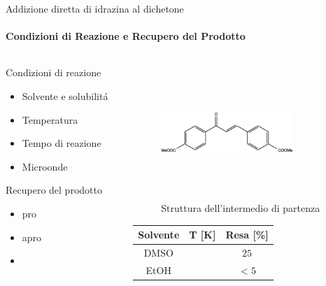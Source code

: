 \documentclass{beamer}
\begin{document}
\begin{frame}{Addizione diretta di idrazina al dichetone}
	\framesubtitle{Condizioni di Reazione e Recupero del Prodotto}
	\begin{columns}
		\hspace{1cm}
		\begin{column}{0.5\textwidth}
			Condizioni di reazione
			\begin{itemize}
				\item Solvente e solubilitá
				\item Temperatura
				\item Tempo di reazione
				\item Microonde
			\end{itemize}
			\vspace{0.2cm}
			Recupero del prodotto
			\begin{itemize}
				\item pro
				\item apro
				\item
			\end{itemize}
		\end{column}
		\hspace{-3cm}
		\begin{column}{0.5\textwidth}
			\vspace{-0.5cm}
			\begin{figure}[h!]
				\centering
				\includegraphics[width=5cm,height=5cm,keepaspectratio]{../Structures/unsaturated.eps}
				\caption{Struttura dell'intermedio di partenza}
			\end{figure}
			\begin{footnotesize}
				\begin{center}
					\begin{tabular}{ccc}
						\toprule
						{Solvente} & T [K] & Resa [\%] \\
						\midrule
						DMSO       &       & \(25\)    \\
						EtOH       &       & \(< 5\)   \\
						\bottomrule
					\end{tabular}
				\end{center}
			\end{footnotesize}
		\end{column}
	\end{columns}
\end{frame}
\end{document}
